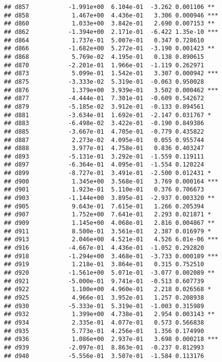 \documentclass[
]{article}
\begin{document}
\begin{verbatim}
## d857           -1.991e+00  6.104e-01  -3.262 0.001106 ** 
## d858            1.467e+00  4.436e-01   3.306 0.000946 ***
## d860            1.033e+00  3.842e-01   2.690 0.007153 ** 
## d862           -1.394e+00  2.171e-01  -6.422 1.35e-10 ***
## d864            1.737e-01  5.007e-01   0.347 0.728610    
## d866           -1.682e+00  5.272e-01  -3.190 0.001423 ** 
## d868            5.769e-02  4.195e-01   0.138 0.890615    
## d870           -2.201e-01  1.966e-01  -1.119 0.262971    
## d873            5.099e-01  1.542e-01   3.307 0.000942 ***
## d875           -3.333e-02  5.319e-01  -0.063 0.950028    
## d876            1.379e+00  3.939e-01   3.502 0.000462 ***
## d877           -4.444e-01  7.301e-01  -0.609 0.542672    
## d879           -5.185e-02  3.912e-01  -0.133 0.894561    
## d881           -3.634e-01  1.692e-01  -2.147 0.031767 *  
## d883           -6.498e-02  3.422e-01  -0.190 0.849386    
## d885           -3.667e-01  4.705e-01  -0.779 0.435822    
## d887            2.273e-02  4.095e-01   0.055 0.955744    
## d888            3.977e-01  4.758e-01   0.836 0.403247    
## d893           -5.131e-01  3.292e-01  -1.559 0.119111    
## d897           -6.364e-01  4.095e-01  -1.554 0.120224    
## d899           -8.727e-01  3.491e-01  -2.500 0.012431 *  
## d900            1.345e+00  3.568e-01   3.769 0.000164 ***
## d901            1.923e-01  5.110e-01   0.376 0.706673    
## d903           -1.144e+00  3.895e-01  -2.937 0.003320 ** 
## d905            9.643e-01  7.615e-01   1.266 0.205394    
## d907            1.752e+00  7.641e-01   2.293 0.021871 *  
## d909            1.145e+00  4.068e-01   2.816 0.004867 ** 
## d911            8.500e-01  3.561e-01   2.387 0.016979 *  
## d913            2.046e+00  4.521e-01   4.526 6.01e-06 ***
## d916           -4.667e-01  4.436e-01  -1.052 0.292820    
## d918           -1.294e+00  3.468e-01  -3.733 0.000189 ***
## d919            1.218e-01  3.864e-01   0.315 0.752510    
## d920           -1.561e+00  5.071e-01  -3.077 0.002089 ** 
## d921           -5.000e-01  9.741e-01  -0.513 0.607739    
## d922            1.100e+00  4.960e-01   2.218 0.026568 *  
## d925            4.966e-01  3.952e-01   1.257 0.208938    
## d930           -5.333e-01  5.319e-01  -1.003 0.315989    
## d932            1.399e+00  4.738e-01   2.954 0.003143 ** 
## d934            2.335e-01  4.077e-01   0.573 0.566838    
## d935            5.773e-01  4.256e-01   1.356 0.174990    
## d936            1.086e+00  2.937e-01   3.698 0.000218 ***
## d939           -2.097e-01  8.863e-01  -0.237 0.812993    
## d940           -5.556e-01  3.507e-01  -1.584 0.113176    

\end{verbatim}
\end{document}
